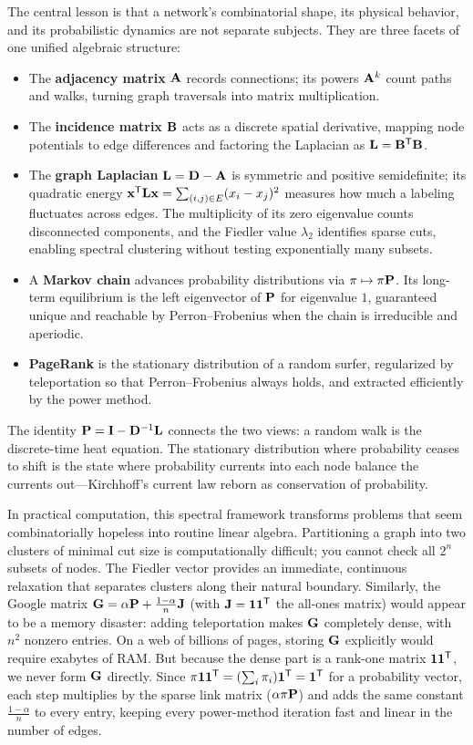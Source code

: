 The central lesson is that a network's combinatorial shape, its physical behavior,
and its probabilistic dynamics are not separate subjects. They are three facets of
one unified algebraic structure:
\begin{itemize}
\item The \textbf{adjacency matrix} $\mathbf{A}$ records connections; its powers
$\mathbf{A}^k$ count paths and walks, turning graph traversals into matrix multiplication.
\item The \textbf{incidence matrix} $\mathbf{B}$ acts as a discrete spatial derivative,
mapping node potentials to edge differences and factoring the Laplacian as
$\mathbf{L} = \mathbf{B}^{\mathsf{T}}\mathbf{B}$.
\item The \textbf{graph Laplacian} $\mathbf{L} = \mathbf{D}-\mathbf{A}$ is symmetric and
positive semidefinite; its quadratic energy $\mathbf{x}^{\mathsf{T}}\mathbf{L}\mathbf{x} = \sum_{(i,j)\in E}(x_i-x_j)^2$
measures how much a labeling fluctuates across edges. The multiplicity of its zero
eigenvalue counts disconnected components, and the Fiedler value $\lambda_2$ identifies
sparse cuts, enabling spectral clustering without testing exponentially
many subsets.
\item A \textbf{Markov chain} advances probability distributions via
$\mathbf{\pi} \mapsto \mathbf{\pi}\mathbf{P}$. Its long-term equilibrium is the left eigenvector of
$\mathbf{P}$ for eigenvalue $1$, guaranteed unique and reachable by Perron--Frobenius
when the chain is irreducible and aperiodic.
\item \textbf{PageRank} is the stationary distribution of a random surfer, regularized
by teleportation so that Perron--Frobenius always holds, and extracted efficiently by
the power method.
\end{itemize}

The identity $\mathbf{P} = \mathbf{I} - \mathbf{D}^{-1}\mathbf{L}$ connects the two views:
a random walk is the discrete-time heat equation. The stationary distribution where
probability ceases to shift is the state where probability currents into each node
balance the currents out---Kirchhoff's current law reborn as conservation of probability.

In practical computation, this spectral framework transforms problems that seem
combinatorially hopeless into routine linear algebra. Partitioning a graph into two
clusters of minimal cut size is computationally difficult; you cannot check all $2^n$ subsets
of nodes. The Fiedler vector provides an immediate, continuous relaxation that
separates clusters along their natural boundary. Similarly, the Google matrix
$\mathbf{G} = \alpha\mathbf{P} + \frac{1-\alpha}{n}\mathbf{J}$ (with $\mathbf{J}=\mathbf{1}\mathbf{1}^{\mathsf{T}}$ the all-ones matrix) would appear to be a
memory disaster: adding teleportation makes $\mathbf{G}$ completely dense, with $n^2$
nonzero entries. On a web of billions of pages, storing $\mathbf{G}$ explicitly would
require exabytes of RAM. But because the dense part is a rank-one matrix $\mathbf{1}\mathbf{1}^{\mathsf{T}}$,
we never form $\mathbf{G}$ directly. Since $\mathbf{\pi}\mathbf{1}\mathbf{1}^{\mathsf{T}} = (\sum_i\pi_i)\mathbf{1}^{\mathsf{T}} = \mathbf{1}^{\mathsf{T}}$
for a probability vector, each step multiplies by the sparse link matrix ($\alpha\mathbf{\pi}\mathbf{P}$)
and adds the same constant $\frac{1-\alpha}{n}$ to every entry,
keeping every power-method iteration fast and linear in the number of edges.

